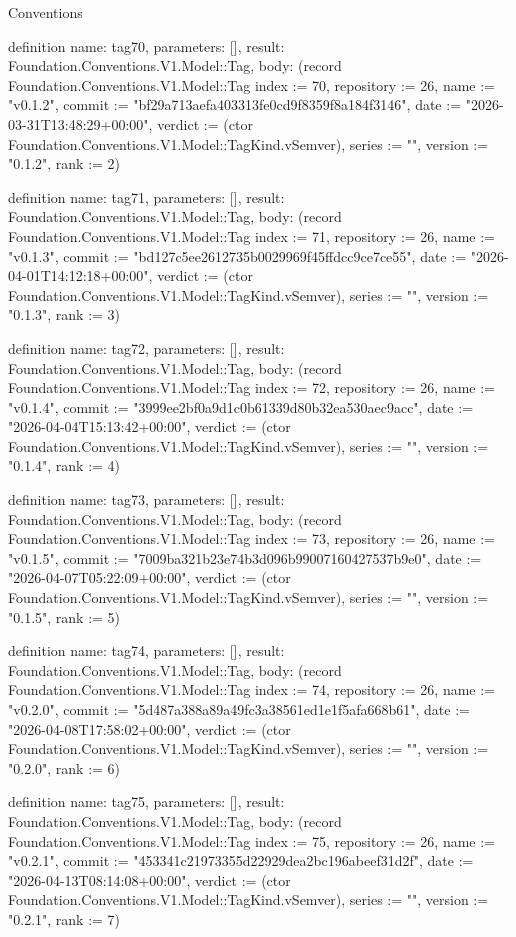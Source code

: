 \begin{lexlean}{Conventions}
\begin{semanticmodule}
definition{
  name: tag70,
  parameters: [],
  result: Foundation.Conventions.V1.Model::Tag,
  body: (record Foundation.Conventions.V1.Model::Tag {index := 70, repository := 26, name := "v0.1.2", commit := "bf29a713aefa403313fe0cd9f8359f8a184f3146", date := "2026-03-31T13:48:29+00:00", verdict := (ctor Foundation.Conventions.V1.Model::TagKind.vSemver), series := "", version := "0.1.2", rank := 2})
}

definition{
  name: tag71,
  parameters: [],
  result: Foundation.Conventions.V1.Model::Tag,
  body: (record Foundation.Conventions.V1.Model::Tag {index := 71, repository := 26, name := "v0.1.3", commit := "bd127c5ee2612735b0029969f45ffdcc9ce7ce55", date := "2026-04-01T14:12:18+00:00", verdict := (ctor Foundation.Conventions.V1.Model::TagKind.vSemver), series := "", version := "0.1.3", rank := 3})
}

definition{
  name: tag72,
  parameters: [],
  result: Foundation.Conventions.V1.Model::Tag,
  body: (record Foundation.Conventions.V1.Model::Tag {index := 72, repository := 26, name := "v0.1.4", commit := "3999ee2bf0a9d1c0b61339d80b32ea530aec9acc", date := "2026-04-04T15:13:42+00:00", verdict := (ctor Foundation.Conventions.V1.Model::TagKind.vSemver), series := "", version := "0.1.4", rank := 4})
}

definition{
  name: tag73,
  parameters: [],
  result: Foundation.Conventions.V1.Model::Tag,
  body: (record Foundation.Conventions.V1.Model::Tag {index := 73, repository := 26, name := "v0.1.5", commit := "7009ba321b23e74b3d096b99007160427537b9e0", date := "2026-04-07T05:22:09+00:00", verdict := (ctor Foundation.Conventions.V1.Model::TagKind.vSemver), series := "", version := "0.1.5", rank := 5})
}

definition{
  name: tag74,
  parameters: [],
  result: Foundation.Conventions.V1.Model::Tag,
  body: (record Foundation.Conventions.V1.Model::Tag {index := 74, repository := 26, name := "v0.2.0", commit := "5d487a388a89a49fc3a38561ed1e1f5afa668b61", date := "2026-04-08T17:58:02+00:00", verdict := (ctor Foundation.Conventions.V1.Model::TagKind.vSemver), series := "", version := "0.2.0", rank := 6})
}

definition{
  name: tag75,
  parameters: [],
  result: Foundation.Conventions.V1.Model::Tag,
  body: (record Foundation.Conventions.V1.Model::Tag {index := 75, repository := 26, name := "v0.2.1", commit := "453341c21973355d22929dea2bc196abeef31d2f", date := "2026-04-13T08:14:08+00:00", verdict := (ctor Foundation.Conventions.V1.Model::TagKind.vSemver), series := "", version := "0.2.1", rank := 7})
}


\end{semanticmodule}
\end{lexlean}
